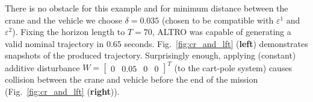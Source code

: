 %
There is no obstacle for this example and for minimum distance between the crane and the vehicle we choose $\delta=0.035$ (chosen to be compatible with $\varepsilon^1$ and $\varepsilon^2$). %
Fixing the horizon length to $T=70$, ALTRO was capable of generating a valid nominal trajectory in $0.65$ seconds. Fig.~\ref{fig:cr_and_lft} (\textbf{left}) demonstrates snapshots of the produced trajectory. Surprisingly enough, applying (constant) additive disturbance $W=\begin{bmatrix}0&0.05&0&0\end{bmatrix}^T$ (to the cart-pole system) causes collision between the crane and vehicle before the end of the mission (Fig.~\ref{fig:cr_and_lft} (\textbf{right})).


